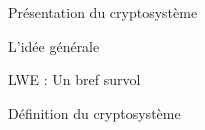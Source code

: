 \begin{section}{Présentation du cryptosystème}
	\begin{subsection}{L'idée générale}
	\end{subsection}
	\begin{subsection}{LWE : Un bref survol}
	\end{subsection}
	\begin{subsection}{Définition du cryptosystème}
	\end{subsection}
\end{section}
